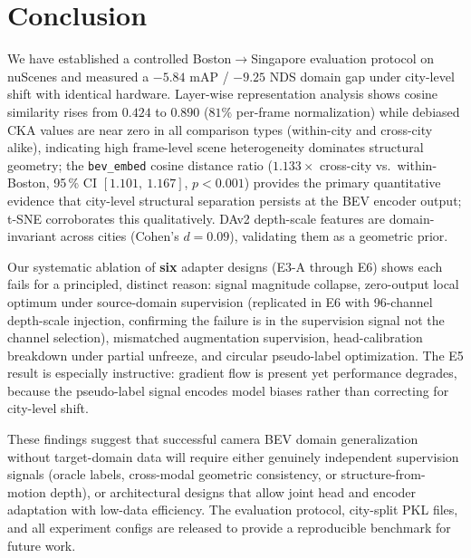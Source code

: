 \documentclass[letterpaper, 10pt, journal]{IEEEtran}
\begin{document}
\section{Conclusion}
\label{sec:conclusion}

We have established a controlled Boston$\to$Singapore evaluation protocol on nuScenes
and measured a $-5.84$ mAP / $-9.25$ NDS domain gap under city-level shift with
identical hardware.
Layer-wise representation analysis shows cosine similarity rises from $0.424$ to
$0.890$ ($81\%$ per-frame normalization) while debiased CKA values are near zero in
all comparison types (within-city and cross-city alike), indicating high frame-level
scene heterogeneity dominates structural geometry; the \texttt{bev\_embed} cosine distance ratio ($1.133\times$ cross-city
vs.\ within-Boston, 95\,\% CI $[1.101,\ 1.167]$, $p < 0.001$)
provides the primary quantitative evidence that city-level structural separation
persists at the BEV encoder output; t-SNE corroborates this qualitatively.
DAv2 depth-scale features are domain-invariant across cities (Cohen's $d = 0.09$),
validating them as a geometric prior.

Our systematic ablation of \textbf{six} adapter designs (E3-A through E6) shows each
fails for a principled, distinct reason: signal magnitude collapse, zero-output local
optimum under source-domain supervision (replicated in E6 with 96-channel depth-scale
injection, confirming the failure is in the supervision signal not the channel
selection), mismatched augmentation supervision, head-calibration breakdown under
partial unfreeze, and circular pseudo-label optimization.
The E5 result is especially instructive: gradient flow is present yet performance
degrades, because the pseudo-label signal encodes model biases rather than correcting
for city-level shift.

These findings suggest that successful camera BEV domain generalization without
target-domain data will require either genuinely independent supervision signals
(oracle labels, cross-modal geometric consistency, or structure-from-motion depth),
or architectural designs that allow joint head and encoder adaptation with
low-data efficiency.
The evaluation protocol, city-split PKL files, and all experiment configs are
released to provide a reproducible benchmark for future work.




\end{document}
